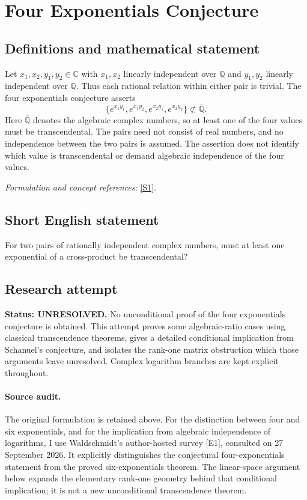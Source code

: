 \documentclass[11pt]{article}
\begin{document}
\section*{\texorpdfstring{Four Exponentials Conjecture}{Four Exponentials Conjecture}}\label{statement}
\subsection{Definitions and mathematical statement}
Let $x_1,x_2,y_1,y_2\in{\mathbb{C}}$ with $x_1,x_2$ linearly independent over ${\mathbb{Q}}$ and $y_1,y_2$ linearly independent over ${\mathbb{Q}}$. Thus each rational relation within either pair is trivial. The four exponentials conjecture asserts
\[
 \{e^{x_1y_1},e^{x_1y_2},e^{x_2y_1},e^{x_2y_2}\}
 \not\subset\overline{{\mathbb{Q}}}.
\]
Here $\overline{{\mathbb{Q}}}$ denotes the algebraic complex numbers, so at least one of the four values must be transcendental. The pairs need not consist of real numbers, and no independence between the two pairs is assumed. The assertion does not identify which value is transcendental or demand algebraic independence of the four values.
\par\smallskip\textit{Formulation and concept references:} \href{https://mathworld.wolfram.com/FourExponentialsConjecture.html}{[S1]}.

\subsection{Short English statement}
For two pairs of rationally independent complex numbers, must at least one exponential of a cross-product be transcendental?
\subsection{Research attempt}
\textbf{Status: UNRESOLVED.} No unconditional proof of the four exponentials conjecture is obtained. This attempt proves some algebraic-ratio cases using classical transcendence theorems, gives a detailed conditional implication from Schanuel's conjecture, and isolates the rank-one matrix obstruction which those arguments leave unresolved. Complex logarithm branches are kept explicit throughout.

\paragraph{Source audit.}
The original formulation is retained above. For the distinction between four and six exponentials, and for the implication from algebraic independence of logarithms, I use Waldschmidt's author-hosted survey [E1], consulted on 27 September 2026. It explicitly distinguishes the conjectural four-exponentials statement from the proved six-exponentials theorem. The linear-space argument below expands the elementary rank-one geometry behind that conditional implication; it is not a new unconditional transcendence theorem.
\end{document}
